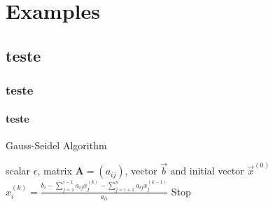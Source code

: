 
\chapter{Examples}
\label{chap:examples}

\section{teste}
\subsection{teste}
\subsubsection{teste}
\begin{algorithm2e}
\caption{Gauss-Seidel Algorithm}\label{alg:gauss-seidel}
\KwIn
{%
scalar $\epsilon$,
matrix $\mathbf{A} = (a_{ij})$,
vector $\vec{b}$
and initial vector $\vec{x}^{(0)}$
}
{
{
$
x_i^{(k)} =
\frac
{
b_i-\sum_{j=1}^{i-1}a_{ij}x_j^{(k)}
-\sum_{j=i+1}^{n}a_{ij}x_j^{(k-1)}
}%
{a_{ii}}
$\;
}
{Stop}
}
\end{algorithm2e}


%   

%   

